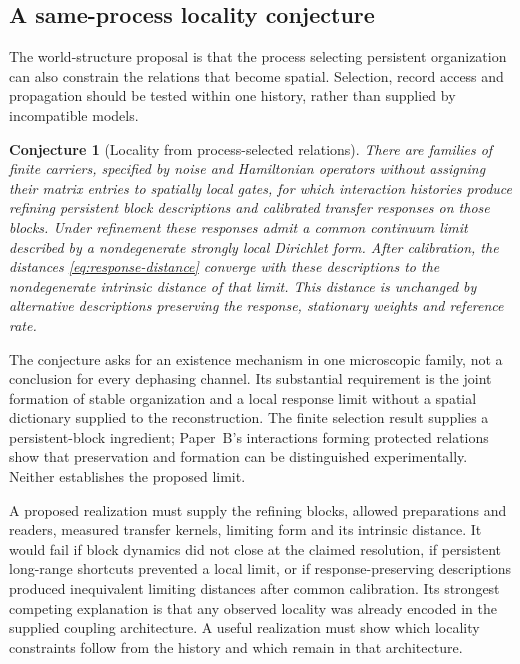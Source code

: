 \documentclass[12pt,a4paper]{article}
\newtheorem{conjecture}[theorem]{Conjecture}
\begin{document}
\subsection{A same-process locality conjecture}

The world-structure proposal is that the process selecting persistent
organization can also constrain the relations that become spatial.
Selection, record access and propagation should be tested within
one history, rather than supplied by incompatible models.

\begin{conjecture}[Locality from process-selected relations]
\label{conj:process-locality}
There are families of finite carriers, specified by noise and
Hamiltonian operators without assigning their matrix entries to
spatially local gates, for which interaction histories produce
refining persistent block descriptions and calibrated transfer
responses on those blocks. Under refinement these responses admit
a common continuum limit described by a nondegenerate strongly
local Dirichlet form. After calibration, the distances
\eqref{eq:response-distance} converge with these descriptions to
the nondegenerate intrinsic distance of that limit. This distance
is unchanged by alternative descriptions preserving the response,
stationary weights and reference rate.
\end{conjecture}

The conjecture asks for an existence mechanism in one microscopic
family, not a conclusion for every dephasing channel. Its substantial
requirement is the joint formation of stable organization and a
local response limit without a spatial dictionary supplied to the
reconstruction. The finite selection result supplies a persistent-block ingredient; Paper~B's interactions forming protected relations show
that preservation and formation can be distinguished experimentally.
Neither establishes the proposed limit.

A proposed realization must supply the refining blocks, allowed
preparations and readers, measured transfer kernels, limiting form
and its intrinsic distance. It would fail if block dynamics did
not close at the claimed resolution, if persistent long-range
shortcuts prevented a local limit, or if response-preserving
descriptions produced inequivalent limiting distances after common
calibration. Its strongest competing explanation is that any
observed locality was already encoded in the supplied coupling
architecture. A useful realization must show which locality
constraints follow from the history and which remain in that
architecture.
\end{document}
